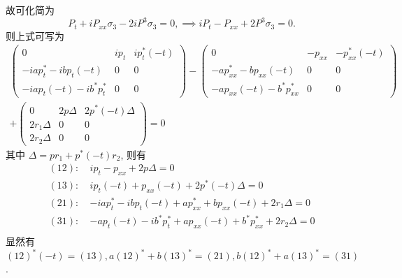 故可化简为
\begin{equation}\label{nls-equation}
    P_{t} + iP_{xx} \sigma_{3} - 2i P^{3}\sigma_{3} = 0, \implies iP_{t} - P_{xx} + 2 P^{3}\sigma_{3} = 0.
\end{equation}
则上式可写为
\begin{equation}
    \begin{aligned}
    \begin{pmatrix}
        0 & ip_{t} & ip_{t}^{*}(-t) \\ -iap^{*}_{t} - ibp_{t}(-t) & 0 & 0 \\ -iap_{t}(-t) - ib^{*}p^{*}_{t} & 0 & 0
    \end{pmatrix}
    - 
    \begin{pmatrix}
        0 & -p_{xx} & -p_{xx}^{*}(-t) \\ -ap^{*}_{xx} - bp_{xx}(-t) & 0 & 0 \\ -ap_{xx}(-t) - b^{*}p^{*}_{xx} & 0 & 0
    \end{pmatrix} \\
    +
    \begin{pmatrix}
        0 & 2p\Delta & 2p^{*}(-t)\Delta \\ 2r_{1} \Delta & 0 & 0 \\ 2r_{2} \Delta & 0 & 0
    \end{pmatrix}
    = 0
\end{aligned}
\end{equation}
其中 $ \Delta = pr_{1} + p^{*}(-t) r_2 $, 则有
\begin{equation}
    \begin{aligned}
        (12): \ &  ip_t - p_{xx} + 2p \Delta = 0 \\
        (13): \ &  ip_{t}(-t) + p_{xx}(-t) + 2p^{*}(-t) \Delta = 0 \\
        (21): \ &  -iap_{t}^{*} - ibp_{t}(-t) + ap_{xx}^{*} + bp_{xx}(-t) + 2r_{1} \Delta = 0 \\
        (31): \ & -ap_{t}(-t) - ib^{*}p_{t}^{*} + ap_{xx}(-t) + b^{*}p_{xx}^{*} + 2r_{2} \Delta  = 0\\
    \end{aligned}
\end{equation}
显然有 $ (12)^{*}(-t) = (13), a(12)^{*} + b(13)^{*} = (21), b(12)^{*} + a(13)^{*} = (31) $.

